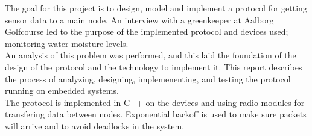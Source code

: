 The goal for this project is to design, model and implement a protocol for getting sensor data to a main node. An interview with a greenkeeper at Aalborg Golfcourse led to the purpose of the implemented protocol and devices used; monitoring water moisture levels. \\
An analysis of this problem was performed, and this laid the foundation of the design of the protocol and the technology to implement it.
This report describes the process of analyzing, designing, implemenenting, and testing the protocol running on embedded systems. \\
The protocol is implemented in C++ on the devices and using radio modules for transfering data between nodes. Exponential backoff is used to make sure packets will arrive and to avoid deadlocks in the system. \\